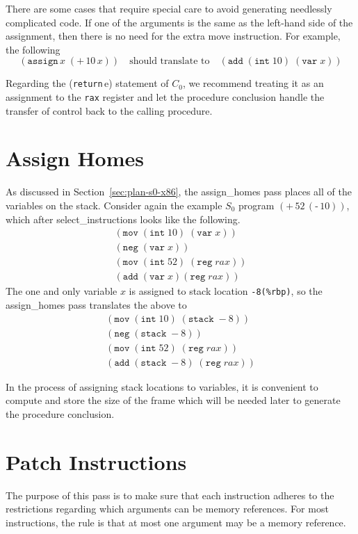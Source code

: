\documentclass[12pt]{book}
\newcommand{\itm}[1]{\ensuremath{\mathit{#1}}}
\newcommand{\key}[1]{\texttt{#1}}
\newcommand{\UNIOP}[2]{(\key{#1}\,#2)}
\newcommand{\BINOP}[3]{(\key{#1}\,#2\,#3)}
\newcommand{\ASSIGN}[2]{(\key{assign}\,#1\;#2)}
\newcommand{\RETURN}[1]{(\key{return}\,#1)}
\newcommand{\INT}[1]{(\key{int}\;#1)}
\newcommand{\REG}[1]{(\key{reg}\;#1)}
\newcommand{\VAR}[1]{(\key{var}\;#1)}
\newcommand{\STACKLOC}[1]{(\key{stack}\;#1)}
\begin{document}
There are some cases that require special care to avoid generating
needlessly complicated code. If one of the arguments is the same as
the left-hand side of the assignment, then there is no need for the
extra move instruction.  For example, the following
\[
\ASSIGN{x}{ \BINOP{+}{10}{x} }
\quad\text{should translate to}\quad
(\key{add} \; \INT{10}\; \VAR{x})
\]

Regarding the \RETURN{e} statement of $C_0$, we recommend treating it
as an assignment to the \key{rax} register and let the procedure
conclusion handle the transfer of control back to the calling
procedure.

\section{Assign Homes}

As discussed in Section~\ref{sec:plan-s0-x86}, the
\textsf{assign\_homes} pass places all of the variables on the stack.
Consider again the example $S_0$ program $\BINOP{+}{52}{ \UNIOP{-}{10} }$,
which after \textsf{select\_instructions} looks like the following.
\[
\begin{array}{l}
(\key{mov}\;\INT{10}\; \VAR{x})\\
(\key{neg}\; \VAR{x})\\
(\key{mov}\; \INT{52}\; \REG{\itm{rax}})\\
(\key{add}\; \VAR{x} \REG{\itm{rax}})
\end{array}
\]
The one and only variable $x$ is assigned to stack location
\key{-8(\%rbp)}, so the \textsf{assign\_homes} pass translates the
above to
\[
\begin{array}{l}
(\key{mov}\;\INT{10}\; \STACKLOC{{-}8})\\
(\key{neg}\; \STACKLOC{{-}8})\\
(\key{mov}\; \INT{52}\; \REG{\itm{rax}})\\
(\key{add}\; \STACKLOC{{-}8}\; \REG{\itm{rax}})
\end{array}
\]

In the process of assigning stack locations to variables, it is
convenient to compute and store the size of the frame which will be
needed later to generate the procedure conclusion.

\section{Patch Instructions}

The purpose of this pass is to make sure that each instruction adheres
to the restrictions regarding which arguments can be memory
references. For most instructions, the rule is that at most one
argument may be a memory reference.
\end{document}
